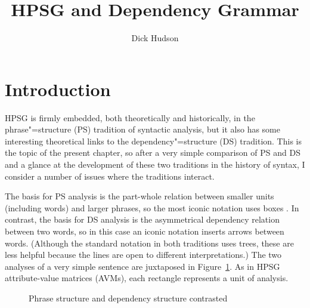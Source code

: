 \documentclass[output=paper
	        ,collection
	        ,collectionchapter
 	        ,biblatex
                ,babelshorthands
                ,newtxmath
                ,draftmode
                ,colorlinks, citecolor=brown
]{./langsci/langscibook}
\author{Dick Hudson\affiliation{University College London}}
\title{HPSG and Dependency Grammar}
\begin{document}
\maketitle
\label{chap-dg}


\section{Introduction}
\label{sec:1}

HPSG is firmly embedded, both theoretically and historically, in the phrase"=structure (PS) tradition of syntactic analysis, but it also has some interesting theoretical links to the dependency"=structure (DS) tradition. This is the topic of the present chapter, so after a very simple comparison of PS and DS and a glance at the development of these two traditions in the history of syntax, I consider a number of issues where the traditions interact.

The basis for PS analysis is the part-whole relation between smaller units (including words) and larger phrases, so the most iconic notation uses boxes \citep[6]{MuellerGT-Eng2}. In contrast, the basis for DS analysis is the asymmetrical dependency relation between two words, so in this case an iconic notation inserts arrows between words. (Although the standard notation in both traditions uses trees, these are less helpful because the lines are open to different interpretations.) The two analyses of a very simple sentence are juxtaposed in Figure~\ref{fig:1}. As in HPSG attribute-value matrices (AVMs), each rectangle represents a unit of analysis.

\begin{figure}
  \centering

\vspace{\baselineskip}

%
	\caption{Phrase structure and dependency structure contrasted}
	\label{fig:1}
\end{figure}
\end{document}
